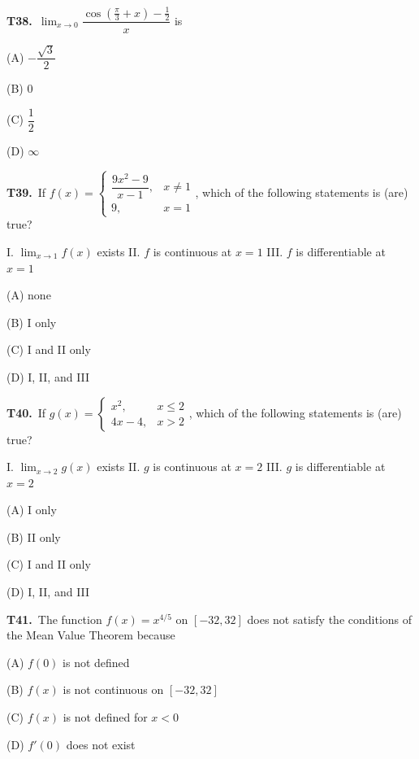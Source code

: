 \documentclass[11pt]{article}
\begin{document}
\bigskip\noindent\textbf{T38.}\ $\displaystyle\lim_{x\to 0}\dfrac{\cos\left(\frac{\pi}{3}+x\right)-\frac{1}{2}}{x}$ is
\begin{list}{}{\setlength{\leftmargin}{3em}\setlength{\labelwidth}{2.5em}\setlength{\itemsep}{0pt}\setlength{\topsep}{2pt}}
\item[(A)] $-\dfrac{\sqrt{3}}{2}$
\item[(B)] $0$
\item[(C)] $\dfrac{1}{2}$
\item[(D)] $\infty$
\end{list}

\bigskip\noindent\textbf{T39.}\ If $f(x) = \begin{cases} \dfrac{9x^2-9}{x-1}, & x \neq 1 \\ 9, & x=1 \end{cases}$, which of the following statements is (are) true?

I. $\displaystyle\lim_{x\to 1} f(x)$ exists
II. $f$ is continuous at $x=1$
III. $f$ is differentiable at $x=1$
\begin{list}{}{\setlength{\leftmargin}{3em}\setlength{\labelwidth}{2.5em}\setlength{\itemsep}{0pt}\setlength{\topsep}{2pt}}
\item[(A)] none
\item[(B)] I only
\item[(C)] I and II only
\item[(D)] I, II, and III
\end{list}

\bigskip\noindent\textbf{T40.}\ If $g(x) = \begin{cases} x^2, & x \leq 2 \\ 4x-4, & x>2 \end{cases}$, which of the following statements is (are) true?

I. $\displaystyle\lim_{x\to 2} g(x)$ exists
II. $g$ is continuous at $x=2$
III. $g$ is differentiable at $x=2$
\begin{list}{}{\setlength{\leftmargin}{3em}\setlength{\labelwidth}{2.5em}\setlength{\itemsep}{0pt}\setlength{\topsep}{2pt}}
\item[(A)] I only
\item[(B)] II only
\item[(C)] I and II only
\item[(D)] I, II, and III
\end{list}

\bigskip\noindent\textbf{T41.}\ The function $f(x) = x^{4/5}$ on $[-32,32]$ does not satisfy the conditions of the Mean Value Theorem because
\begin{list}{}{\setlength{\leftmargin}{3em}\setlength{\labelwidth}{2.5em}\setlength{\itemsep}{0pt}\setlength{\topsep}{2pt}}
\item[(A)] $f(0)$ is not defined
\item[(B)] $f(x)$ is not continuous on $[-32,32]$
\item[(C)] $f(x)$ is not defined for $x<0$
\item[(D)] $f'(0)$ does not exist
\end{list}
\end{document}
